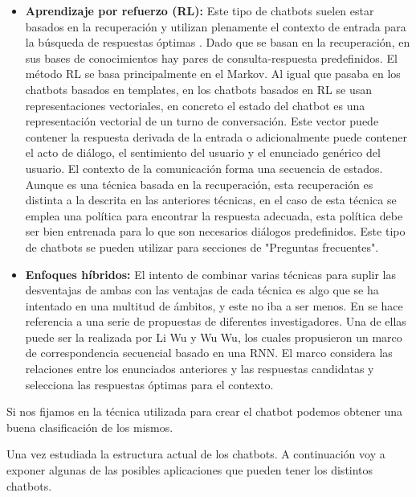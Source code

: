 \begin{itemize}
\item \textbf{Aprendizaje por refuerzo (RL):} Este tipo de chatbots suelen estar basados en la recuperación y utilizan plenamente el contexto de entrada para la búsqueda de respuestas óptimas \cite{RefWorks:RefID:36-luo2022critical}. Dado que se basan en la recuperación, en sus bases de conocimientos hay pares de consulta-respuesta predefinidos. El método RL se basa principalmente en el \gls{Markov}. Al igual que pasaba en los chatbots basados en templates, en los chatbots basados en RL se usan representaciones vectoriales, en concreto el estado del chatbot es una representación vectorial de un turno de conversación. Este vector puede contener la respuesta derivada de la entrada o adicionalmente puede contener el acto de diálogo, el sentimiento del usuario y el enunciado genérico del usuario. El contexto de la comunicación forma una secuencia de estados. Aunque es una técnica basada en la recuperación, esta recuperación es distinta a la descrita en las anteriores técnicas, en el caso de esta técnica se emplea una política para encontrar la respuesta adecuada, esta política debe ser bien entrenada para lo que son necesarios diálogos predefinidos. Este tipo de chatbots se pueden utilizar para secciones de "Preguntas frecuentes".
\item \textbf{Enfoques híbridos:} \label{enfoque_hibrido} El intento de combinar varias técnicas para suplir las desventajas de ambas con las ventajas de cada técnica es algo que se ha intentado en una multitud de ámbitos, y este no iba a ser menos. En \cite{RefWorks:RefID:36-luo2022critical} se hace referencia a una serie de propuestas de diferentes investigadores. Una de ellas puede ser la realizada por Li Wu y Wu Wu, los cuales propusieron un marco de correspondencia secuencial basado en una RNN. El marco considera las relaciones entre los enunciados anteriores y las respuestas candidatas y selecciona las respuestas óptimas para el contexto.
\end{itemize}

Si nos fijamos en la técnica utilizada para crear el chatbot podemos obtener una buena clasificación de los mismos.

Una vez estudiada la estructura actual de los chatbots. A continuación voy a exponer algunas de las posibles aplicaciones que pueden tener los distintos chatbots.

